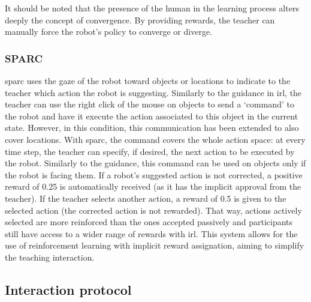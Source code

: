 It should be noted that the presence of the human in the learning process alters deeply the concept of convergence. By providing rewards, the teacher can manually force the robot's policy to converge or diverge.

\subsubsection{SPARC}

\gls{sparc} uses the gaze of the robot toward objects or locations to indicate to the teacher which action the robot is suggesting. Similarly to the guidance in \gls{irl}, the teacher can use the right click of the mouse on objects to send a `command' to the robot and have it execute the action associated to this object in the current state. However, in this condition, this communication has been extended to also cover locations. With \gls{sparc}, the command covers the whole action space: at every time step, the teacher can specify, if desired, the next action to be executed by the robot. Similarly to the guidance, this command can be used on objects only if the robot is facing them. If a robot's suggested action is not corrected, a positive reward of 0.25 is automatically received (as it has the implicit approval from the teacher). If the teacher selects another action, a reward of 0.5 is given to the selected action (the corrected action is not rewarded). That way, actions actively selected are more reinforced than the ones accepted passively and participants still have access to a wider range of rewards with \gls{irl}. This system allows for the use of reinforcement learning with implicit reward assignation, aiming to simplify the teaching interaction.

\subsection{Interaction protocol}

